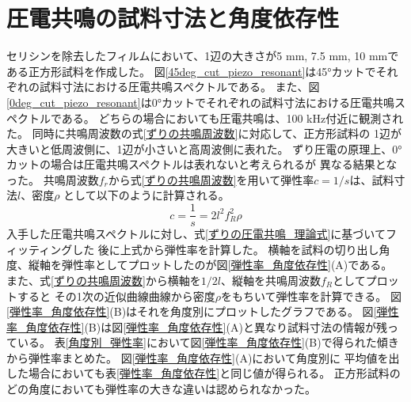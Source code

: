 \documentclass[dvipdfmx,12pt,a4paper]{jreport}
\begin{document}
			\section{圧電共鳴の試料寸法と角度依存性}
			セリシンを除去したフィルムにおいて、1辺の大きさが5 mm, 7.5 mm, 10 mmである正方形試料を作成した。
			図\ref{45deg_cut_piezo_resonant}は45°カットでそれぞれの試料寸法における圧電共鳴スペクトルである。
			また、図\ref{0deg_cut_piezo_resonant}は0°カットでそれぞれの試料寸法における圧電共鳴スペクトルである。
			どちらの場合においても圧電共鳴は、100 kHz付近に観測された。
			同時に共鳴周波数の式\eqref{ずりの共鳴周波数}に対応して、正方形試料の
			1辺が大きいと低周波側に、1辺が小さいと高周波側に表れた。
			ずり圧電の原理上、0°カットの場合は圧電共鳴スペクトルは表れないと考えられるが
			異なる結果となった。
			共鳴周波数$f_r$から式\eqref{ずりの共鳴周波数}を用いて弾性率$c=1/s$は、試料寸法$l$、密度$\rho$
			として以下のように計算される。
			\begin{equation}
				c = \frac{1}{s} = 2l^2 f_R^2 \rho
			\end{equation}
			入手した圧電共鳴スペクトルに対し、式\eqref{ずりの圧電共鳴_理論式}に基づいてフィッティングした
			後に上式から弾性率を計算した。
			横軸を試料の切り出し角度、縦軸を弾性率としてプロットしたのが図\ref{弾性率_角度依存性}(A)である。
			また、式\eqref{ずりの共鳴周波数}から横軸を$1/2l$、縦軸を共鳴周波数$f_R$としてプロットすると
			その1次の近似曲線曲線から密度$\rho$をもちいて弾性率を計算できる。
			図\ref{弾性率_角度依存性}(B)はそれを角度別にプロットしたグラフである。
			図\ref{弾性率_角度依存性}(B)は図\ref{弾性率_角度依存性}(A)と異なり試料寸法の情報が残っている。
			表\ref{角度別_弾性率}において図\ref{弾性率_角度依存性}(B)で得られた傾きから弾性率まとめた。
			図\ref{弾性率_角度依存性}(A)において角度別に
			平均値を出した場合においても表\ref{弾性率_角度依存性}と同じ値が得られる。
			正方形試料のどの角度においても弾性率の大きな違いは認められなかった。
\end{document}
